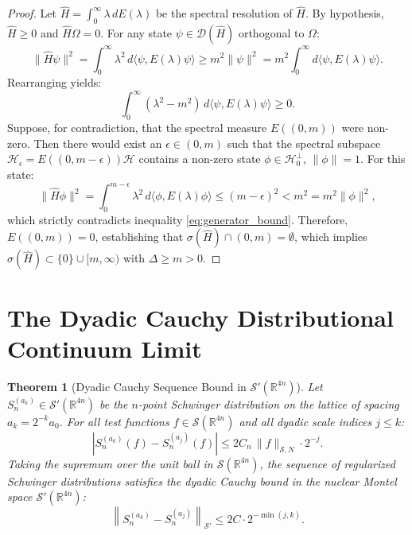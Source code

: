 \documentclass[11pt,reqno]{amsart}
\theoremstyle{plain}
\newtheorem{theorem}{Theorem}[section]
\theoremstyle{definition}
\theoremstyle{remark}
\numberwithin{equation}{section}
\begin{document}
\begin{proof}
Let $\hat{H} = \int_0^\infty \lambda \, dE(\lambda)$ be the spectral resolution of $\hat{H}$. By hypothesis, $\hat{H} \ge 0$ and $\hat{H}\Omega = 0$. For any state $\psi \in \mathcal{D}(\hat{H})$ orthogonal to $\Omega$:
\begin{equation}
\|\hat{H} \psi\|^2 = \int_0^\infty \lambda^2 \, d\langle \psi, E(\lambda)\psi \rangle \ge m^2 \|\psi\|^2 = m^2 \int_0^\infty d\langle \psi, E(\lambda)\psi \rangle.
\end{equation}
Rearranging yields:
\begin{equation}
\int_0^\infty (\lambda^2 - m^2) \, d\langle \psi, E(\lambda)\psi \rangle \ge 0.
\end{equation}
Suppose, for contradiction, that the spectral measure $E((0, m))$ were non-zero. Then there would exist an $\epsilon \in (0, m)$ such that the spectral subspace $\mathcal{H}_\epsilon = E((0, m - \epsilon))\mathcal{H}$ contains a non-zero state $\phi \in \mathcal{H}_0^\perp$, $\|\phi\| = 1$. For this state:
\begin{equation}
\|\hat{H} \phi\|^2 = \int_0^{m - \epsilon} \lambda^2 \, d\langle \phi, E(\lambda)\phi \rangle \le (m - \epsilon)^2 < m^2 = m^2 \|\phi\|^2,
\end{equation}
which strictly contradicts inequality \eqref{eq:generator_bound}. Therefore, $E((0, m)) = 0$, establishing that $\sigma(\hat{H}) \cap (0, m) = \emptyset$, which implies $\sigma(\hat{H}) \subset \{0\} \cup [m, \infty)$ with $\Delta \ge m > 0$.
\end{proof}

\section{The Dyadic Cauchy Distributional Continuum Limit}
\label{sec:continuum}

\begin{theorem}[Dyadic Cauchy Sequence Bound in $\mathcal{S}'(\mathbb{R}^{4n})$]
\label{thm:cauchy_limit}
Let $S_n^{(a_k)} \in \mathcal{S}'(\mathbb{R}^{4n})$ be the $n$-point Schwinger distribution on the lattice of spacing $a_k = 2^{-k} a_0$. For all test functions $f \in \mathcal{S}(\mathbb{R}^{4n})$ and all dyadic scale indices $j \le k$:
\begin{equation}
\left| S_n^{(a_k)}(f) - S_n^{(a_j)}(f) \right| \le 2 C_n \, \|f\|_{\mathcal{S}, N} \cdot 2^{-j}.
\end{equation}
Taking the supremum over the unit ball in $\mathcal{S}(\mathbb{R}^{4n})$, the sequence of regularized Schwinger distributions satisfies the dyadic Cauchy bound in the nuclear Montel space $\mathcal{S}'(\mathbb{R}^{4n})$:
\begin{equation}
\left\| S_n^{(a_k)} - S_n^{(a_j)} \right\|_{\mathcal{S}'} \le 2C \cdot 2^{-\min(j, k)}.
\end{equation}
\end{theorem}
\end{document}
